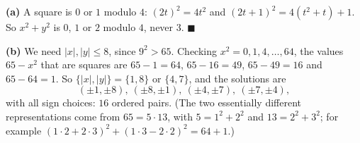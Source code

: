 \textbf{(a)} A square is $0$ or $1$ modulo $4$: $(2t)^2=4t^2$ and $(2t+1)^2=4(t^2+t)+1$. So $x^2+y^2$ is $0$, $1$ or $2$ modulo $4$, never $3$. $\blacksquare$

\textbf{(b)} We need $|x|,|y|\le8$, since $9^2>65$. Checking $x^2=0,1,4,\dots,64$, the values $65-x^2$ that are squares are $65-1=64$, $65-16=49$, $65-49=16$ and $65-64=1$. So $\{|x|,|y|\}=\{1,8\}$ or $\{4,7\}$, and the solutions are
\[
(\pm1,\pm8),\ (\pm8,\pm1),\ (\pm4,\pm7),\ (\pm7,\pm4),
\]
with all sign choices: $\boxed{16}$ ordered pairs. (The two essentially different representations come from $65=5\cdot13$, with $5=1^2+2^2$ and $13=2^2+3^2$; for example $(1\cdot2+2\cdot3)^2+(1\cdot3-2\cdot2)^2=64+1$.)
